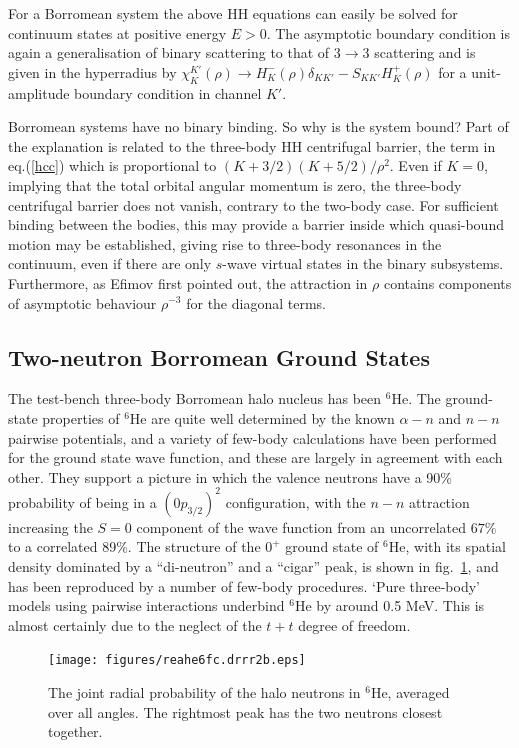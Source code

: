 For a Borromean system the above HH equations can easily be solved
for continuum states at positive energy $E>0$. The asymptotic
boundary condition is again a generalisation of binary scattering
to that of $3\rightarrow 3$ scattering and is given in the
hyperradius by $\chi_K^{K'}(\rho)\rightarrow
H^-_K(\rho)\delta_{KK'} -S_{KK'}H^+_K(\rho)$ for a
unit-amplitude boundary condition in channel $K'$.

Borromean systems have no binary binding. So why is the system
bound? Part of the explanation is related to the three-body HH
centrifugal barrier, the term in eq.(\ref{hcc})  which is
proportional to $ (K+3/2)(K+5/2)/\rho^2 $. Even if $K=0$, implying
that the total orbital angular momentum is zero, the three-body
centrifugal barrier does not vanish, contrary to the two-body
case. For sufficient binding between the bodies, this may provide
a barrier inside which quasi-bound motion may be established, giving
rise to three-body resonances in the continuum, even if there are
only $s$-wave virtual states in the binary subsystems.
Furthermore, as Efimov \cite{efim90} first pointed out, the
attraction in $\rho$ contains components of asymptotic behaviour
$\rho^{-3}$ for the diagonal terms.

\subsection{Two-neutron Borromean Ground States}

The test-bench three-body Borromean halo nucleus has been $^6$He.
The ground-state properties of  $^6$He  are quite well determined
by the known $\alpha - n$ and $n-n$ pairwise potentials, and a
variety of few-body calculations have been performed for the
ground state wave function, and these are largely in agreement
with each other. They support a picture in which the valence
neutrons have a 90\% probability of being in a $(0p_{3/2})^2$
configuration, with the $n-n$ attraction increasing the $S=0$
component of the wave function from an uncorrelated $67\%$ to a
correlated 89\%. The structure of the $0^+$ ground state of
$^6$He, with its spatial density dominated by a ``di-neutron'' and
a ``cigar'' peak, is shown in fig.~\ref{he6rr}, and has  been
reproduced by a number of few-body procedures. `Pure three-body'
models using pairwise interactions underbind $^6$He by around 0.5
MeV. This is almost certainly due to the neglect of the $t+t$
degree of freedom.

\begin{figure}
\begin{center}
\texttt{[image: figures/reahe6fc.drrr2b.eps]}
\end{center}
\caption{The joint radial probability of the halo neutrons in
    $^6$He, averaged over all angles.  The rightmost peak
    has the two neutrons closest together.
} \label{he6rr}
\end{figure}

